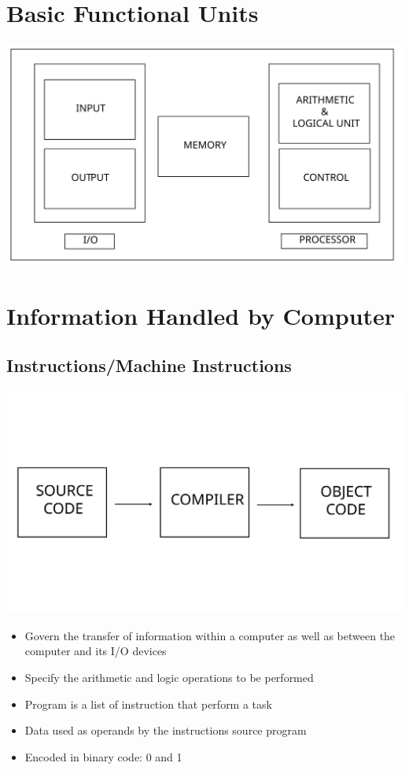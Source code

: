 \documentclass[british]{extreport}
\begin{document}
\section{Basic Functional Units}
\begin{center}
	\includegraphics[scale=0.3]{Picture/FUNCTIONAL_UNIT}
	\par\end{center}

\section{Information Handled by Computer}

\subsection{Instructions/Machine Instructions}
\begin{center}
	\includegraphics[scale=0.25]{Picture/COMPILER_DIAGRAM}
	\par\end{center}
\begin{itemize}
	\item Govern the transfer of information within a computer as well as between
	      the computer and its I/O devices
	\item Specify the arithmetic and logic operations to be performed
	\item Program is a list of instruction that perform a task
	\item Data used as operands by the instructions source program
	\item Encoded in binary code: 0 and 1
\end{itemize}
\end{document}
